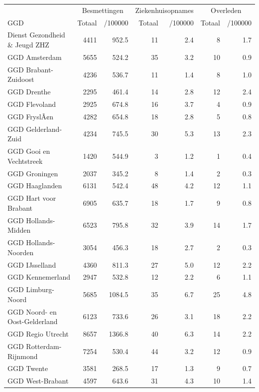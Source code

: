 \documentclass[
  english,
  man,floatsintext]{apa6}
\begin{document}
\begin{table}
\centering\begingroup\fontsize{10}{12}\selectfont

\begin{threeparttable}
\begin{tabular}{lrrrrrr}
\toprule
\multicolumn{1}{c}{ } & \multicolumn{2}{c}{Besmettingen} & \multicolumn{2}{c}{Ziekenhuisopnames} & \multicolumn{2}{c}{Overleden} \\
\cmidrule(l{3pt}r{3pt}){2-3} \cmidrule(l{3pt}r{3pt}){4-5} \cmidrule(l{3pt}r{3pt}){6-7}
GGD & Totaal & /100000 & Totaal & /100000 & Totaal & /100000\\
\midrule
Dienst Gezondheid \& Jeugd ZHZ & 4411 & 952.5 & 11 & 2.4 & 8 & 1.7\\
GGD Amsterdam & 5655 & 524.2 & 35 & 3.2 & 10 & 0.9\\
GGD Brabant-Zuidoost & 4236 & 536.7 & 11 & 1.4 & 8 & 1.0\\
GGD Drenthe & 2295 & 461.4 & 14 & 2.8 & 12 & 2.4\\
GGD Flevoland & 2925 & 674.8 & 16 & 3.7 & 4 & 0.9\\
GGD FryslÃ¢n & 4282 & 654.8 & 18 & 2.8 & 5 & 0.8\\
GGD Gelderland-Zuid & 4234 & 745.5 & 30 & 5.3 & 13 & 2.3\\
GGD Gooi en Vechtstreek & 1420 & 544.9 & 3 & 1.2 & 1 & 0.4\\
GGD Groningen & 2037 & 345.2 & 8 & 1.4 & 2 & 0.3\\
GGD Haaglanden & 6131 & 542.4 & 48 & 4.2 & 12 & 1.1\\
GGD Hart voor Brabant & 6905 & 635.7 & 18 & 1.7 & 9 & 0.8\\
GGD Hollands-Midden & 6523 & 795.8 & 32 & 3.9 & 14 & 1.7\\
GGD Hollands-Noorden & 3054 & 456.3 & 18 & 2.7 & 2 & 0.3\\
GGD IJsselland & 4360 & 811.3 & 27 & 5.0 & 12 & 2.2\\
GGD Kennemerland & 2947 & 532.8 & 12 & 2.2 & 6 & 1.1\\
GGD Limburg-Noord & 5685 & 1084.5 & 35 & 6.7 & 25 & 4.8\\
GGD Noord- en Oost-Gelderland & 6123 & 733.6 & 26 & 3.1 & 18 & 2.2\\
GGD Regio Utrecht & 8657 & 1366.8 & 40 & 6.3 & 14 & 2.2\\
GGD Rotterdam-Rijnmond & 7254 & 530.4 & 44 & 3.2 & 12 & 0.9\\
GGD Twente & 3581 & 268.5 & 17 & 1.3 & 9 & 0.7\\
GGD West-Brabant & 4597 & 643.6 & 31 & 4.3 & 10 & 1.4\\

\end{tabular}
\end{threeparttable}
\end{table}
\end{document}
